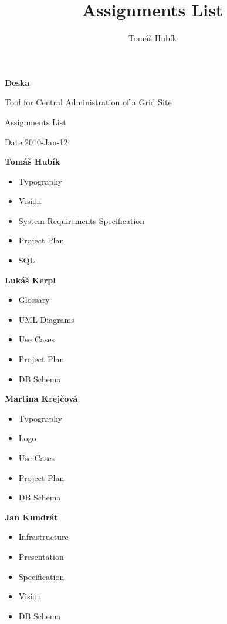 \documentclass[12pt]{article}
\author{Tomáš Hubík}
\title{Assignments List}
\begin{document}
{\Huge \textbf{Deska}}

\vspace{0.2in}

{\large Tool for Central Administration of a Grid Site}

\vspace{0.5in}

{\large Assignments List}

\vspace{0.2in}

{\large Date 2010-Jan-12}

\vspace{0.5in}


{\Large \textbf{Tomáš Hubík}}
\begin{itemize}
	\item Typography
	\item Vision
	\item System Requirements Specification
	\item Project Plan
	\item SQL
\end{itemize}

\vspace{0.5in}

{\Large \textbf{Lukáš Kerpl}}
\begin{itemize}
	\item Glossary
	\item UML Diagrams
	\item Use Cases
	\item Project Plan
	\item DB Schema
\end{itemize}

\vspace{0.5in}

{\Large \textbf{Martina Krejčová}}
\begin{itemize}
	\item Typography
	\item Logo
	\item Use Cases
	\item Project Plan
	\item DB Schema
\end{itemize}

\vspace{0.5in}

{\Large \textbf{Jan Kundrát}}
\begin{itemize}
	\item Infrastructure
	\item Presentation
	\item Specification
	\item Vision
	\item DB Schema
\end{itemize}
\end{document}
